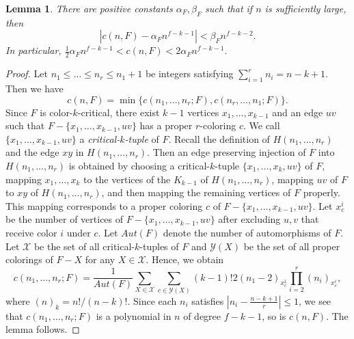 \documentclass[10pt]{article}
\newtheorem{lemma}[theorem]{Lemma}
\begin{document}
\begin{lemma}\label{counting F in H(n,p,k) with adding an edge}
There are positive constants $\alpha_F,\beta_F$ such that if $n$ is sufficiently large, then
$$|c(n,F)-\alpha_F n^{f-k-1}|<\beta_F n ^{f-k-2}.$$
In particular, $\frac{1}{2}\alpha_F n^{f-k-1} <c(n,F)<2\alpha_F n^{f-k-1}.$
\end{lemma}
\begin{proof}
Let $n_1\leq \ldots\leq n_r\leq n_1+1$ be integers satisfying $\sum_{i=1}^r n_i=n-k+1$. Then we have
$$
c(n,F)=\min\{c(n_1,\ldots,n_r;F),c(n_r,\ldots,n_1;F)\}.
$$
Since $F$ is color-$k$-critical, there exist $k-1$ vertices $x_1,\ldots,x_{k-1}$ and an edge $uv$ such that $F-\{x_1,\ldots,x_{k-1}, uv\}$ has a proper $r$-coloring $c$.
We call $\{x_1,\ldots,x_{k-1},uv\}$ a {\it critical-$k$-tuple} of $F$.
Recall the definition of $H(n_1,\ldots, n_r)$ and the edge $xy$ in $H(n_1,\ldots, n_r)$.
Then an edge preserving injection of $F$ into $H(n_1,\ldots, n_r)$ is obtained by choosing a critical-$k$-tuple $\{x_1,\ldots,x_k,uv\}$ of $F$,
mapping $x_1,\ldots,x_k$ to the vertices of the $K_{k-1}$ of $H(n_1,\ldots, n_r)$, mapping $uv$ of $F$ to $xy$ of $H(n_1,\ldots, n_r)$, and then mapping the remaining vertices of $F$ properly.
This mapping corresponds to a proper coloring $c$ of $F-\{x_1,\ldots,x_{k-1}, uv\}$.
Let $x_c^i$ be the number of vertices of $F-\{x_1,\ldots,x_{k-1}, uv\}$ after excluding $u,v$ that receive color $i$ under $c$.
Let $Aut(F)$ denote the number of automorphisms of $F$.
Let $\mathcal{X}$ be the set of all critical-$k$-tuples of $F$ and $\mathcal{Y}(X)$ be the set of all proper colorings of $F-X$ for any $X\in \mathcal{X}$.
Hence, we obtain
\begin{equation}\label{number of F in h(n,p,k)}
c(n_1,\ldots,n_r;F)=\frac{1}{Aut(F)}\sum_{X\in \mathcal{X}}\sum_{c\in \mathcal{Y}(X)}(k-1)!2(n_1-2)_{x_{c}^1}\prod^r_{i=2}(n_i)_{x_{c}^i},
\end{equation}
where $(n)_k =n!/(n-k)!$. Since each $n_i$ satisfies $|n_i-\frac{n-k+1}{r}|\leq 1$,
we see that $c(n_1,\ldots,n_r;F)$ is a polynomial in $n$ of degree $f-k-1$, so is $c(n,F)$.
The lemma follows.
\end{proof}
\end{document}
